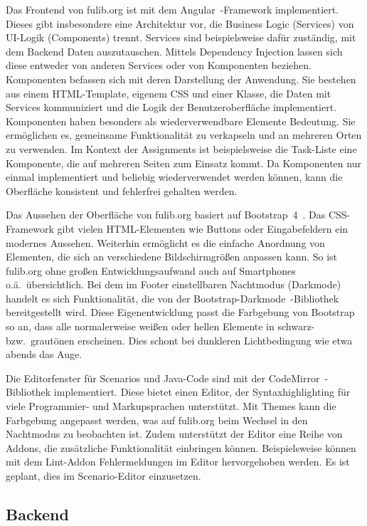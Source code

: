 Das Frontend von fulib.org ist mit dem Angular~\cite{angular}-Framework implementiert.
Dieses gibt insbesondere eine Architektur vor, die Business Logic (Services) von UI-Logik (Components) trennt.
Services sind beispielsweise dafür zuständig, mit dem Backend Daten auszutauschen.
Mittels Dependency Injection lassen sich diese entweder von anderen Services oder von Komponenten beziehen.
Komponenten befassen sich mit deren Darstellung der Anwendung.
Sie bestehen aus einem HTML-Template, eigenem CSS und einer Klasse,
die Daten mit Services kommuniziert und die Logik der Benutzeroberfläche implementiert.
Komponenten haben besonders als wiederverwendbare Elemente Bedeutung.
Sie ermöglichen es, gemeinsame Funktionalität zu verkapseln und an mehreren Orten zu verwenden.
Im Kontext der Assignments ist beispielsweise die Task-Liste eine Komponente, die auf mehreren Seiten zum Einsatz kommt.
Da Komponenten nur einmal implementiert und beliebig wiederverwendet werden können,
kann die Oberfläche konsistent und fehlerfrei gehalten werden.

Das Aussehen der Oberfläche von fulib.org basiert auf Bootstrap~4~\cite{bootstrap}.
Das CSS-Framework gibt vielen HTML-Elementen wie Buttons oder Eingabefeldern ein modernes Aussehen.
Weiterhin ermöglicht es die einfache Anordnung von Elementen, die sich an verschiedene Bildschirmgrößen anpassen kann.
So ist fulib.org ohne großen Entwicklungsaufwand auch auf Smartphones o.ä.\ übersichtlich.
Bei dem im Footer einstellbaren Nachtmodus (Darkmode) handelt es sich Funktionalität,
die von der Bootstrap-Darkmode~\cite{bootstrap-darkmode}-Bibliothek bereitgestellt wird.
Diese Eigenentwicklung passt die Farbgebung von Bootstrap so an, dass alle normalerweise weißen oder hellen Elemente in schwarz- bzw.\ grautönen erscheinen.
Dies schont bei dunkleren Lichtbedingung wie etwa abends das Auge.

Die Editorfenster für Scenarios und Java-Code sind mit der CodeMirror~\cite{codemirror}-Bibliothek implementiert.
Diese bietet einen Editor, der Syntaxhighlighting für viele Programmier- und Markupsprachen unterstützt.
Mit Themes kann die Farbgebung angepasst werden, was auf fulib.org beim Wechsel in den Nachtmodus zu beobachten ist.
Zudem unterstützt der Editor eine Reihe von Addons, die zusätzliche Funktionalität einbringen können.
Beispielsweise können mit dem Lint-Addon Fehlermeldungen im Editor hervorgehoben werden.
Es ist geplant, dies im Scenario-Editor einzusetzen.

\subsection{Backend}\label{subsec:backend}

